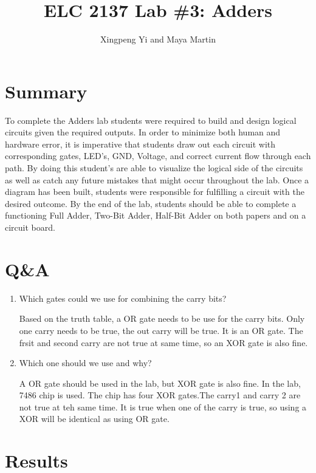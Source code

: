 \documentclass[11pt]{article}
\begin{document}
\title{ELC 2137 Lab \#3: Adders}
\author{Xingpeng Yi and Maya Martin}

\maketitle


\section*{Summary}

To complete the Adders lab students were required to build and design logical circuits given the required outputs. In order to minimize both human and hardware error, it is imperative that students draw out each circuit with corresponding gates, LED’s, GND, Voltage, and correct current flow through each path. By doing this student’s are able to visualize the logical side of the circuits as well as catch any future mistakes that might occur throughout the lab. Once a diagram has been built, students were responsible for fulfilling a circuit with the desired outcome. By the end of the lab, students should be able to complete a functioning Full Adder, Two-Bit Adder, Half-Bit Adder on both papers and on a circuit board. 


\section*{Q\&A}

\begin{enumerate}
	\item  Which gates could we use for combining the carry bits?
	
	Based on the truth table, a OR gate needs to be use for the carry bits. Only one carry needs to be true, the out carry will be true. It is an OR gate. The frsit and second carry are not true at same time, so an XOR gate is also fine.
	
	\item Which one should we use and why?
	
	A OR gate should be used in the lab, but XOR gate is also fine. In the lab, 7486 chip is used.  The chip has four XOR gates.The carry1 and carry 2 are not true at teh same time. It is true when one of the carry is true, so using a XOR will be identical as using OR gate.
\end{enumerate}


\section*{Results}
\end{document}
